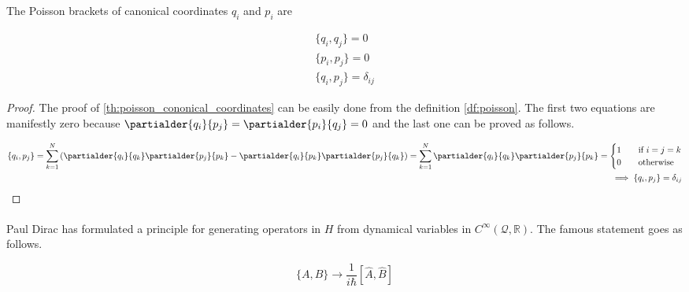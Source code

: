\begin{theorem}
    \label{th:poisson_cononical_coordinates}
    The Poisson brackets of canonical coordinates $q_{i}$ and $p_{i}$ are

    \begin{equation}
        \begin{gathered}
        \{q_{i}, q_{j}\} = 0 \\
        \{p_{i}, p_{j}\} = 0 \\
        \{q_{i}, p_{j}\} = \delta_{ij}
        \end{gathered}
    \end{equation}
\end{theorem}

\begin{proof}
    The proof of \ref{th:poisson_cononical_coordinates} can be easily done from the definition \ref{df:poisson}. 
    The first two equations are manifestly zero because $\partialder{q_{i}}{p_{j}} = \partialder{p_{i}}{q_{j}} = 0$
    and the last one can be proved as follows.

    \begin{equation}
        \begin{split}
            \{q_{i}, p_{j}\} = \sum_{k=1}^{N}\left(\partialder{q_{i}}{q_{k}} \partialder{p_{j}}{p_{k}} - \partialder{q_{i}}{p_{k}} \partialder{p_{j}}{q_{k}}\right) 
            = \sum_{k=1}^{N} \partialder{q_{i}}{q_{k}} \partialder{p_{j}}{p_{k}} = 
            \begin{cases}
                1  & \quad \text{if } i = j = k \\
                0  & \quad \text{otherwise}
            \end{cases} \\
            \implies \{q_{i}, p_{j}\} = \delta_{ij}
        \end{split}
    \end{equation}
\end{proof}

\paragraph{} Paul Dirac has formulated a principle for generating operators in $H$ from dynamical variables in $C^{\infty}(\mathcal{Q}, \mathbb{R})$. 
The famous statement goes as follows.

\begin{equation}
    \label{eq:dirac_quantization}
    \{A, B\} \to \frac{1}{i \hbar}[\hat{A}, \hat{B}]
\end{equation}

